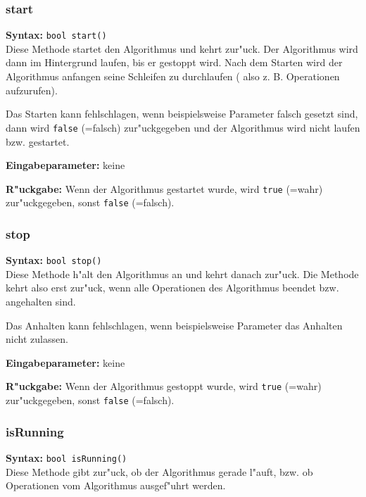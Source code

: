 \subsubsection{start}

\textbf{Syntax:} \verb|bool start()| \\

Diese Methode startet den Algorithmus und kehrt zur"uck. Der Algorithmus wird dann im Hintergrund laufen, bis er gestoppt wird. Nach dem Starten wird der Algorithmus anfangen seine Schleifen zu durchlaufen ( also z. B. Operationen aufzurufen).

Das Starten kann fehlschlagen, wenn beispielsweise Parameter falsch gesetzt sind, dann wird \verb|false| (=falsch) zur"uckgegeben und der Algorithmus wird nicht laufen bzw. gestartet.

\bigskip\noindent
\textbf{Eingabeparameter:} keine

\bigskip\noindent
\textbf{R"uckgabe:} Wenn der Algorithmus gestartet wurde, wird \verb|true| (=wahr) zur"uckgegeben, sonst \verb|false| (=falsch).

\subsubsection{stop}

\textbf{Syntax:} \verb|bool stop()| \\

Diese Methode h"alt den Algorithmus an und kehrt danach zur"uck. Die Methode kehrt also erst zur"uck, wenn alle Operationen des Algorithmus beendet bzw. angehalten sind.

Das Anhalten kann fehlschlagen, wenn beispielsweise Parameter das Anhalten nicht zulassen.

\bigskip\noindent
\textbf{Eingabeparameter:} keine

\bigskip\noindent
\textbf{R"uckgabe:} Wenn der Algorithmus gestoppt wurde, wird \verb|true| (=wahr) zur"uckgegeben, sonst \verb|false| (=falsch).


\subsubsection{isRunning}

\textbf{Syntax:} \verb|bool isRunning()| \\

Diese Methode gibt zur"uck, ob der Algorithmus gerade l"auft, bzw. ob Operationen vom Algorithmus ausgef"uhrt werden.

